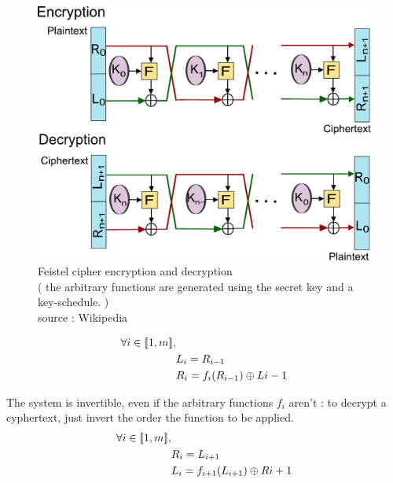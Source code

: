 \begin{figure}[ht!]
    \centering
       \includegraphics[width=\textwidth]{images/Feistel_cipher_encryption.pdf}
    \caption{Feistel cipher encryption and decryption \\ ( the arbitrary functions are generated using the secret key and a key-schedule. )\\ source : Wikipedia}
	\label{fig:Feistel_cipher}
\end{figure}
 

\begin{mytheorem}
    \begin{align}
        \forall i \in \llbracket1,m\rrbracket,&                 \\
        &L_i = R_{i-1}                                          \\
        &R_i = f_i(R_{i-1}) \oplus L{i-1}                         
    \end{align}
\end{mytheorem}

The system is invertible, even if the arbitrary functions $f_i$ aren't : to decrypt a cyphertext, just invert the order the function to be applied. 
\begin{align}   
    \forall i \in \llbracket1,m\rrbracket,&                     \\
    &R_i = L_{i+1}                                              \\
    & L_i = f_{i+1}(L_{i+1}) \oplus R{i+1}                    
\end{align}

